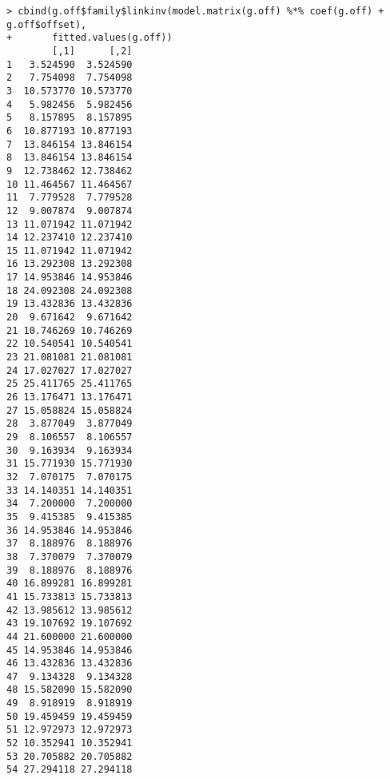 \documentclass[11pt]{article}
\begin{document}
\begin{verbatim}
> cbind(g.off$family$linkinv(model.matrix(g.off) %*% coef(g.off) + g.off$offset),
+       fitted.values(g.off))
        [,1]      [,2]
1   3.524590  3.524590
2   7.754098  7.754098
3  10.573770 10.573770
4   5.982456  5.982456
5   8.157895  8.157895
6  10.877193 10.877193
7  13.846154 13.846154
8  13.846154 13.846154
9  12.738462 12.738462
10 11.464567 11.464567
11  7.779528  7.779528
12  9.007874  9.007874
13 11.071942 11.071942
14 12.237410 12.237410
15 11.071942 11.071942
16 13.292308 13.292308
17 14.953846 14.953846
18 24.092308 24.092308
19 13.432836 13.432836
20  9.671642  9.671642
21 10.746269 10.746269
22 10.540541 10.540541
23 21.081081 21.081081
24 17.027027 17.027027
25 25.411765 25.411765
26 13.176471 13.176471
27 15.058824 15.058824
28  3.877049  3.877049
29  8.106557  8.106557
30  9.163934  9.163934
31 15.771930 15.771930
32  7.070175  7.070175
33 14.140351 14.140351
34  7.200000  7.200000
35  9.415385  9.415385
36 14.953846 14.953846
37  8.188976  8.188976
38  7.370079  7.370079
39  8.188976  8.188976
40 16.899281 16.899281
41 15.733813 15.733813
42 13.985612 13.985612
43 19.107692 19.107692
44 21.600000 21.600000
45 14.953846 14.953846
46 13.432836 13.432836
47  9.134328  9.134328
48 15.582090 15.582090
49  8.918919  8.918919
50 19.459459 19.459459
51 12.972973 12.972973
52 10.352941 10.352941
53 20.705882 20.705882
54 27.294118 27.294118
\end{verbatim}
\end{document}
